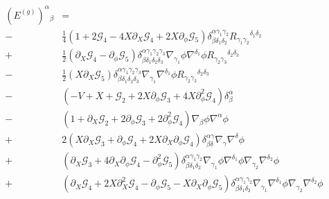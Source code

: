 \documentclass{ws-ijmpd}
\begin{document}
\begin{align}
\label{eq:tensor_eom_horndeski}
   \left(E^{(g)}\right)^{\alpha}{}_{\beta}
   &=
   \nonumber\\
   -&
   \frac{1}{4}\left(
      1 
      + 
      2\mathcal{G}_4 
      - 
      4X\partial_X\mathcal{G}_4 
      + 
      2X \partial_{\phi}\mathcal{G}_5
   \right)
   \delta^{\alpha\gamma_1\gamma_2}_{\beta\delta_1\delta_2}
   R_{\gamma_1\gamma_2}{}^{\delta_1\delta_2}
   \nonumber\\
   +&
   \frac{1}{2}\left(
      \partial_X\mathcal{G}_4
      -
      \partial_{\phi}\mathcal{G}_5
   \right)
   \delta^{\alpha\gamma_1\gamma_2\gamma_3}_{\beta\delta_1\delta_2\delta_3}
   \nabla_{\gamma_1}\phi\nabla^{\delta_1}\phi
   R_{\gamma_2\gamma_3}{}^{\delta_2\delta_3}
   \nonumber\\
   -&
   \frac{1}{2}
   \left(X\partial_X\mathcal{G}_5\right)
   \delta^{\alpha\gamma_1\gamma_2\gamma_3}_{\beta\delta_1\delta_2\delta_3}
   \nabla_{\gamma_1}\nabla^{\delta_1}\phi
   R_{\gamma_2\gamma_3}{}^{\delta_2\delta_3}
   \nonumber\\
   -&
   \left(
      -
      V
      +
      X
      +
      \mathcal{G}_2
      +
      2X\partial_{\phi}\mathcal{G}_3
      +
      4X\partial_{\phi}^2\mathcal{G}_4
   \right)
   \delta^{\alpha}_{\beta}
   \nonumber\\
   -&
   \left(
      1
      +
      \partial_X\mathcal{G}_2
      +
      2\partial_{\phi}\mathcal{G}_3
      +
      2\partial_{\phi}^2\mathcal{G}_4
   \right)
   \nabla_{\beta}\phi\nabla^{\alpha}\phi
   \nonumber\\
   +&
   2\left(
      X\partial_X\mathcal{G}_3
      +
      \partial_{\phi}\mathcal{G}_4
      +
      2X\partial_X\partial_{\phi}\mathcal{G}_4
   \right)
   \delta^{\alpha\gamma}_{\beta\delta}
   \nabla_{\gamma}\nabla^{\delta}\phi
   \nonumber\\
   +&
   \left(
      \partial_X\mathcal{G}_3
      +
      4\partial_X\partial_{\phi}\mathcal{G}_4
      -
      \partial_{\phi}^2\mathcal{G}_5
   \right)
   \delta^{\alpha\gamma_1\gamma_2}_{\beta\delta_1\delta_2}
   \nabla_{\gamma_1}\phi\nabla^{\delta_1}\phi
   \nabla_{\gamma_2}\nabla^{\delta_2}\phi
   \nonumber\\
   +&
   \left(
      \partial_X\mathcal{G}_4
      +
      2X\partial_X^2\mathcal{G}_4
      -
      \partial_{\phi}\mathcal{G}_5
      -
      X\partial_X\partial_{\phi}\mathcal{G}_5
   \right)
   \delta^{\alpha\gamma_1\gamma_2}_{\beta\delta_1\delta_2}
   \nabla_{\gamma_1}\nabla^{\delta_1}\phi
   \nabla_{\gamma_2}\nabla^{\delta_2}\phi

\end{align}
\end{document}
